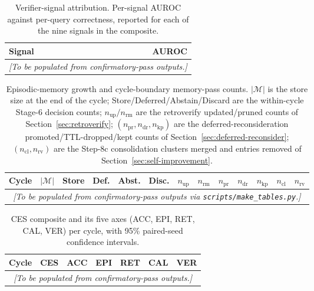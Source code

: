\begin{table}[t]
\centering
\caption{Verifier-signal attribution. Per-signal AUROC against
per-query correctness, reported for each of the nine signals in
the composite.}
\label{tab:verifier-attrib}
\begin{tabular}{lr}
\toprule
Signal & AUROC \\
\midrule
\multicolumn{2}{c}{\emph{[To be populated from confirmatory-pass outputs.]}}\\
\bottomrule
\end{tabular}
\end{table}

\begin{table}[t]
\centering
\caption{Episodic-memory growth and cycle-boundary memory-pass counts. $|\mathcal{M}|$ is the store size at the end of the cycle; Store/Deferred/Abstain/Discard are the within-cycle Stage-6 decision counts; $n_{\text{up}}/n_{\text{rm}}$ are the retroverify updated/pruned counts of Section~\ref{sec:retroverify}; $(n_{\text{pr}}, n_{\text{dr}}, n_{\text{kp}})$ are the deferred-reconsideration promoted/TTL-dropped/kept counts of Section~\ref{sec:deferred-reconsider}; $(n_{\text{cl}}, n_{\text{rv}})$ are the Step-8c consolidation clusters merged and entries removed of Section~\ref{sec:self-improvement}.}
\label{tab:memory-growth}
\scriptsize
\setlength{\tabcolsep}{3pt}
\begin{tabular}{lrrrrr|rr|rrr|rr}
\toprule
Cycle & $|\mathcal{M}|$ & Store & Def. & Abst. & Disc. & $n_{\text{up}}$ & $n_{\text{rm}}$ & $n_{\text{pr}}$ & $n_{\text{dr}}$ & $n_{\text{kp}}$ & $n_{\text{cl}}$ & $n_{\text{rv}}$ \\
\midrule
\multicolumn{13}{c}{\emph{[To be populated from confirmatory-pass outputs via \texttt{scripts/make\_tables.py}.]}}\\
\bottomrule
\end{tabular}
\end{table}

\begin{table}[t]
\centering
\caption{CES composite and its five axes (ACC, EPI, RET, CAL, VER)
per cycle, with 95\% paired-seed confidence intervals.}
\label{tab:ces}
\begin{tabular}{lrrrrrr}
\toprule
Cycle & CES & ACC & EPI & RET & CAL & VER \\
\midrule
\multicolumn{7}{c}{\emph{[To be populated from confirmatory-pass outputs.]}}\\
\bottomrule
\end{tabular}
\end{table}

